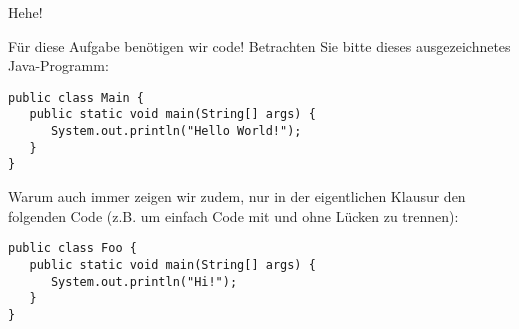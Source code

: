 \begin{Exercise}[5]{Hehe!}
\label{ex:second}%

Für diese Aufgabe benötigen wir code!
Betrachten Sie bitte dieses ausgezeichnetes Java-Programm:

\begin{verbatim}
public class Main {
   public static void main(String[] args) {
      System.out.println("Hello World!");
   }
}
\end{verbatim}

\begin{examonly}
Warum auch immer zeigen wir zudem, nur in der eigentlichen Klausur den folgenden Code (z.B. um einfach Code mit und ohne Lücken zu trennen):
\begin{verbatim}
public class Foo {
   public static void main(String[] args) {
      System.out.println("Hi!");
   }
}
\end{verbatim}
\end{examonly}


\end{Exercise}
